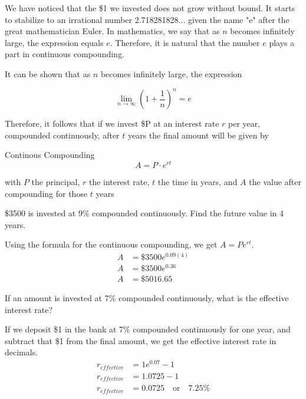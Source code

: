 We have noticed that the \$1 we invested does not grow without bound. It starts to stabilize to an irrational number 2.718281828... given the name "e" after the great mathematician Euler. In mathematics, we say that as $n$ becomes infinitely large, the expression equals $e$. Therefore, it is natural that the number $e$ plays a part in continuous compounding.

It can be shown that as $n$ becomes infinitely large, the expression

\[ \lim_{n \to \infty} \left(1 + \frac{1}{n}\right)^n = e \]

Therefore, it follows that if we invest \$P at an interest rate $r$ per year, compounded continuously, after $t$ years the final amount will be given by

\begin{summarybox}{Continous Compounding}
    \[ A = P \cdot e^{rt} \]

    with $P$ the principal, $r$ the interest rate, $t$ the time in years, and $A$ the value after compounding for those $t$ years
\end{summarybox}


\begin{example}
    \$3500 is invested at 9\% compounded continuously. Find the future value in 4 years.
\end{example}
\begin{solution}
    Using the formula for the continuous compounding, we get $A = Pe^{rt}$.
    \begin{align*}
        A & = \$3500e^{0.09 (4)} \\
        A & = \$3500e^{0.36}     \\
        A & = \$5016.65
    \end{align*}
\end{solution}

\begin{example}
    If an amount is invested at 7\% compounded continuously, what is the effective interest rate?
\end{example}
\begin{solution}
    If we deposit \$1 in the bank at 7\% compounded continuously for one year, and subtract that \$1 from the final amount, we get the effective interest rate in decimals.
    \begin{align*}
        r_{effective} & = 1e^{0.07} - 1                       \\
        r_{effective} & = 1.0725 - 1                          \\
        r_{effective} & = 0.0725 \quad \text{or} \quad 7.25\%
    \end{align*}
\end{solution}

